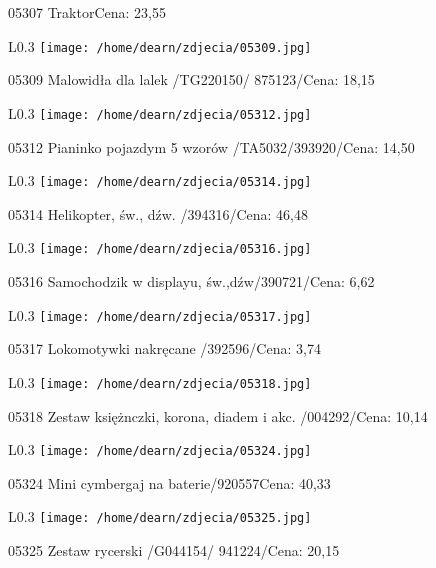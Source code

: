 05307 TraktorCena: 23,55\newline
\begin{wrapfigure}{L}{0.3\textwidth}
\texttt{[image: /home/dearn/zdjecia/05309.jpg]}
\end{wrapfigure}
05309 Malowidła dla lalek /TG220150/ 875123/Cena: 18,15\newline
\begin{wrapfigure}{L}{0.3\textwidth}
\texttt{[image: /home/dearn/zdjecia/05312.jpg]}
\end{wrapfigure}
05312 Pianinko pojazdym 5 wzorów /TA5032/393920/Cena: 14,50\newline
\begin{wrapfigure}{L}{0.3\textwidth}
\texttt{[image: /home/dearn/zdjecia/05314.jpg]}
\end{wrapfigure}
05314 Helikopter, św., dźw. /394316/Cena: 46,48\newline
\begin{wrapfigure}{L}{0.3\textwidth}
\texttt{[image: /home/dearn/zdjecia/05316.jpg]}
\end{wrapfigure}
05316 Samochodzik w displayu, św.,dźw/390721/Cena: 6,62\newline
\begin{wrapfigure}{L}{0.3\textwidth}
\texttt{[image: /home/dearn/zdjecia/05317.jpg]}
\end{wrapfigure}
05317 Lokomotywki nakręcane /392596/Cena: 3,74\newline
\begin{wrapfigure}{L}{0.3\textwidth}
\texttt{[image: /home/dearn/zdjecia/05318.jpg]}
\end{wrapfigure}
05318 Zestaw księżnczki, korona, diadem i akc. /004292/Cena: 10,14\newline
\begin{wrapfigure}{L}{0.3\textwidth}
\texttt{[image: /home/dearn/zdjecia/05324.jpg]}
\end{wrapfigure}
05324 Mini cymbergaj na baterie/920557Cena: 40,33\newline
\begin{wrapfigure}{L}{0.3\textwidth}
\texttt{[image: /home/dearn/zdjecia/05325.jpg]}
\end{wrapfigure}
05325 Zestaw rycerski /G044154/ 941224/Cena: 20,15\newline
